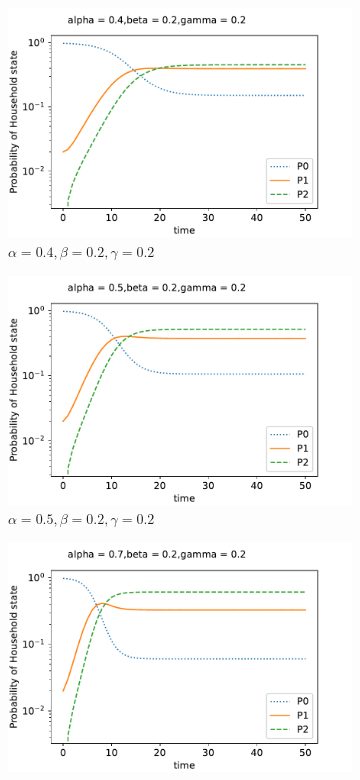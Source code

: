 \documentclass[paper=a4, fontsize=11pt, twoside, BCOR=12mm, parskip=full, listof=totoc]{scrreprt}
\begin{document}
{\begin{figure}[H]
	\centering
	\begin{subfigure}[b]{0.4\linewidth}
	    \includegraphics[width=\linewidth]{sim/01g1.pdf}
	    \caption{\(\alpha=0.4, \beta=0.2, \gamma=0.2\)}
	    \label{alpha four}
	\end{subfigure}
	\begin{subfigure}[b]{0.4\linewidth}
	    \includegraphics[width=\linewidth]{sim/021_g2.pdf}
	    \caption{\(\alpha=0.5, \beta=0.2, \gamma=0.2\)}
	    \label{alpha five}
	\end{subfigure}
	\begin{subfigure}[b]{0.4\linewidth}
	    \includegraphics[width=\linewidth]{sim/031_g4.pdf}

\end{subfigure}
\end{figure}}
\end{document}

